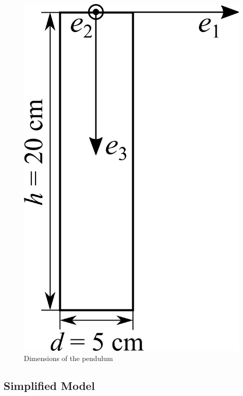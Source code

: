 \documentclass[10pt]{article}
\begin{document}
\begin{figure}
	\centering
	\includegraphics{pendulum.png}
	\caption{Dimensions of the pendulum \label{fig:pendulum}}
\end{figure}

\subsection{Simplified Model}
\end{document}

